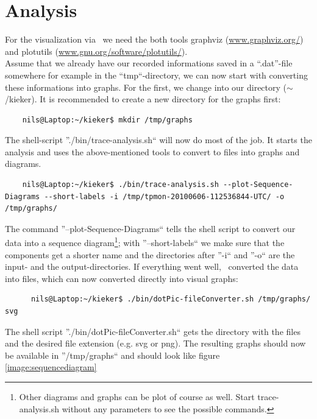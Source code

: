 	\section{Analysis}
      For the visualization via \Kieker\ we need the both tools graphviz (\url{www.graphviz.org/}) and plotutils (\url{www.gnu.org/software/plotutils/}).\\
      Assume that we already have our recorded informations saved in a ``.dat''-file somewhere for example in the ``tmp``-directory, we can now start with converting these informations into graphs. For the first, we change into our \Kieker\-directory ($\sim$/kieker). It is recommended to create a new directory for the graphs first:
      \begin{lstlisting}
	nils@Laptop:~/kieker$ mkdir /tmp/graphs
      \end{lstlisting}
      The shell-script ''./bin/trace-analysis.sh`` will now do most of the job. It starts the analysis and uses the above-mentioned tools to convert to files into graphs and diagrams.
      \begin{lstlisting}
	nils@Laptop:~/kieker$ ./bin/trace-analysis.sh --plot-Sequence-Diagrams --short-labels -i /tmp/tpmon-20100606-112536844-UTC/ -o /tmp/graphs/
      \end{lstlisting}
	The command ''--plot-Sequence-Diagrams`` tells the shell script to convert our data into a sequence diagram\footnote{Other diagrams and graphs can be plot of course as well. Start trace-analysis.sh without any parameters to see the possible commands.}; with ''--short-labels`` we make sure that the components get a shorter name and the directories after ''-i`` and ''-o`` are the input- and the output-directories. If everything went well, \Kieker\ converted the data into files, which can now converted directly into visual graphs:
	\begin{lstlisting}
	  nils@Laptop:~/kieker$ ./bin/dotPic-fileConverter.sh /tmp/graphs/ svg
	\end{lstlisting}
	The shell script ''./bin/dotPic-fileConverter.sh`` gets the directory with the files and the desired file extension (e.g. svg or png). The resulting graphs should now be available in ''/tmp/graphs`` and should look like figure \ref{image:sequencediagram}
